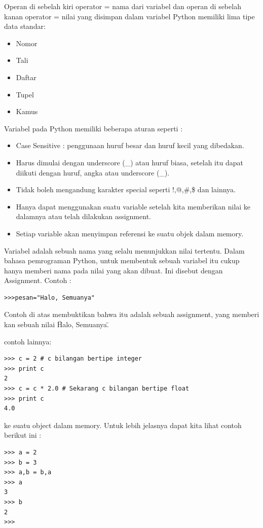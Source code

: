 Operan di sebelah kiri operator =  nama dari variabel dan operan di sebelah kanan operator = nilai yang disimpan dalam variabel
Python memiliki lima tipe data standar:
\begin{itemize}
\item Nomor
\item Tali
\item Daftar
\item Tupel
\item Kamus
\end{itemize}

Variabel pada Python memiliki beberapa aturan seperti :
\begin{itemize}
\item
Case Sensitive : penggunaan huruf besar dan huruf kecil yang dibedakan.
\item
Harus dimulai dengan underscore (\_) atau huruf biasa, setelah itu dapat diikuti dengan huruf, angka atau underscore (\_).
\item
Tidak boleh mengandung karakter special seperti !,@,\#,\$ dan lainnya.
\item
Hanya dapat menggunakan suatu variable setelah kita memberikan nilai ke dalamnya atau telah dilakukan assignment.
\item
Setiap variable akan menyimpan referensi ke suatu objek dalam memory.\cite{santoso2009bahasa}
\end{itemize}

Variabel adalah sebuah nama yang selalu menunjukkan nilai tertentu. Dalam bahasa pemrograman Python, untuk membentuk sebuah variabel itu cukup hanya memberi nama pada nilai yang akan dibuat. Ini disebut dengan Assignment.
Contoh : 
\begin{verbatim}
>>>pesan="Halo, Semuanya"
\end{verbatim}
Contoh di atas membuktikan bahwa itu adalah sebuah assignment, yang memberi kan sebuah nilai \"Halo, Semuanya\".\cite{utami2004logika}

contoh lainnya:
\begin{verbatim}
>>> c = 2 # c bilangan bertipe integer
>>> print c
2
>>> c = c * 2.0 # Sekarang c bilangan bertipe float
>>> print c
4.0
\end{verbatim}

ke suatu object dalam memory. Untuk lebih jelasnya
dapat kita lihat contoh berikut ini :
\begin{verbatim}
>>> a = 2
>>> b = 3
>>> a,b = b,a
>>> a
3
>>> b
2
>>>
\end{verbatim}


